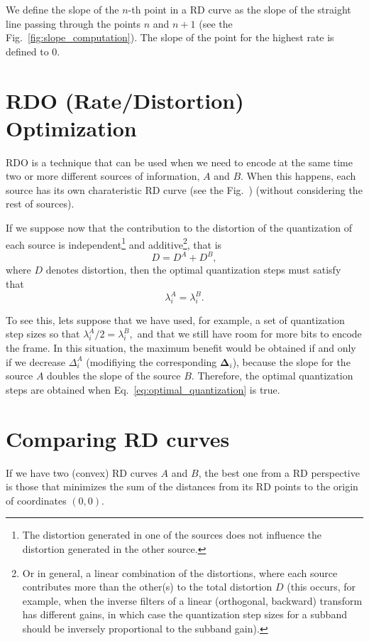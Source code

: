 We define the slope of the $n$-th point in a RD curve as the slope of
the straight line passing through the points $n$ and $n+1$ (see the
Fig.~\ref{fig:slope_computation}). The slope of the point for the
highest rate is defined to $0$.

\section{RDO (Rate/Distortion) Optimization}

RDO is a technique that can be used when we need to encode at the same
time two or more different sources of information, $A$ and $B$. When this
happens, each source has its own charateristic RD curve (see the
Fig.~\cite{RD_slopes}) (without considering the rest of sources).

If we suppose now that the contribution to the distortion of the
quantization of each source is independent\footnote{The distortion
generated in one of the sources does not influence the distortion
generated in the other source.} and additive\footnote{Or in general, a
linear combination of the distortions, where each source contributes
more than the other(s) to the total distortion $D$ (this occurs, for
example, when the inverse filters of a linear (orthogonal, backward)
transform has different gains, in which case the quantization step
sizes for a subband should be inversely proportional to the subband
gain).}, that is
\begin{equation}
  D = D^A + D^B,
  \label{eq:additive}
\end{equation}
where $D$ denotes distortion, then the optimal quantization steps must
satisfy that~\cite{vetterli1995wavelets,sayood2017introduction}
\begin{equation}
  \lambda^A_i = \lambda^B_i.
  \label{eq:optimal_quantization}
\end{equation}

To see this, lets suppose that we have used, for example, a set of
quantization step sizes so that $\lambda^A_i/2 = \lambda^B_i,$ and
that we still have room for more bits to encode the frame. In this
situation, the maximum benefit would be obtained if and only if we
decrease $\Delta^A_i$ (modifiying the corresponding
$\mathbf{\Delta}_i$), because the slope for the source $A$ doubles
the slope of the source $B$. Therefore, the optimal quantization
steps are obtained when Eq.~\ref{eq:optimal_quantization} is
true.

\section{Comparing RD curves}
If we have two (convex) RD curves $A$ and $B$, the best one from a RD
perspective is those that minimizes the sum of the distances from its
RD points to the origin of coordinates $(0,0)$.

